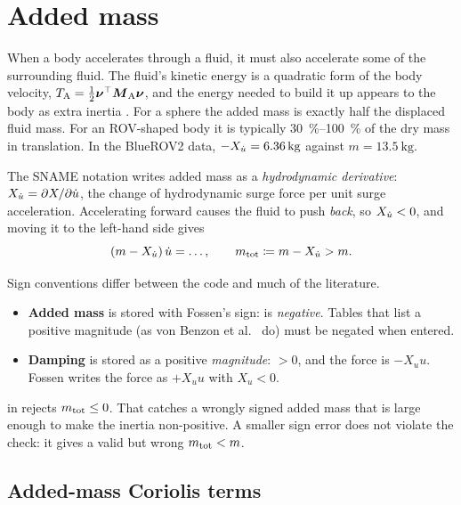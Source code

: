 \section{Added mass}
\label{sec:addedmass}

When a body accelerates through a fluid, it must also accelerate some of the surrounding
fluid. The fluid's kinetic energy is a quadratic form of the body velocity,
$T_\mathrm{A} = \tfrac12\boldsymbol{\nu}^\top\boldsymbol{M}_\mathrm{A}\boldsymbol{\nu}$, and the energy needed to
build it up appears to the body as extra inertia \cite{newman1977}. For a sphere the added
mass is exactly half the displaced fluid mass. For an ROV-shaped body it is typically
\SIrange{30}{100}{\percent} of the dry mass in translation. In the BlueROV2 data,
$-X_{\dot u} = \qty{6.36}{\kilogram}$ against $m = \qty{13.5}{\kilogram}$.

The SNAME notation writes added mass as a \emph{hydrodynamic derivative}:
$X_{\dot u} = \partial X/\partial\dot u$, the change of hydrodynamic surge force per unit surge
acceleration. Accelerating forward causes the fluid to push \emph{back}, so $X_{\dot u} < 0$, and
moving it to the left-hand side gives
\begin{equation}
  (m - X_{\dot u})\,\dot u = \dots, \qquad m_\mathrm{tot} \coloneqq m - X_{\dot u} > m.
  \label{eq:mtot}
\end{equation}

\begin{caution}
Sign conventions differ between the code and much of the literature.
\begin{itemize}[nosep]
  \item \textbf{Added mass} is stored with Fossen's sign:  is \emph{negative}.
        Tables that list a positive magnitude (as von Benzon et al.\ \cite{vonbenzon2022} do)
        must be negated when entered.
  \item \textbf{Damping} is stored as a positive \emph{magnitude}:  $> 0$, and the
        force is $-X_u u$. Fossen writes the force as $+X_u u$ with $X_u < 0$.
\end{itemize}
 in  rejects $m_\mathrm{tot} \le 0$. That catches a
wrongly signed added mass that is large enough to make the inertia non-positive. A smaller
sign error does not violate the check: it gives a valid but wrong $m_\mathrm{tot} < m$.
\end{caution}

\subsection{Added-mass Coriolis terms}

